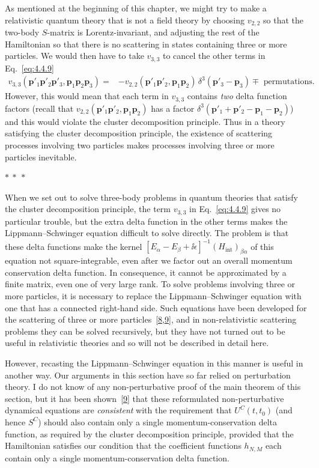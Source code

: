 As mentioned at the beginning of this chapter, we might try to make a
relativistic quantum theory that is not a field theory by choosing $v_{2,2}$ so
that the two-body $S$-matrix is Lorentz-invariant, and adjusting the rest of the
Hamiltonian so that there is no scattering in states containing three or more
particles. We would then have to take $v_{3,3}$ to cancel the other terms in
Eq.~\eqref{eq:4.4.9}
\begin{align}
v_{3,3}(\mathbf{p}'_1\mathbf{p}'_2\mathbf{p}'_3,
 \mathbf{p}_1\mathbf{p}_2\mathbf{p}_3)
={}&-v_{2,2}(\mathbf{p}'_1\mathbf{p}'_2,
 \mathbf{p}_1\mathbf{p}_2)\,
 \delta^3(\mathbf{p}'_3-\mathbf{p}_3)
 \mathbin{\mp}\text{ permutations}.
\tag{4.4.10}
\label{eq:4.4.10}
\end{align}
However, this would mean that each term in $v_{3,3}$ contains \emph{two} delta
function factors (recall that
$v_{2,2}(\mathbf{p}'_1\mathbf{p}'_2,\mathbf{p}_1\mathbf{p}_2)$ has a factor
$\delta^3(\mathbf{p}'_1+\mathbf{p}'_2-\mathbf{p}_1-\mathbf{p}_2)$) and this
would violate the cluster decomposition principle. Thus in a theory satisfying
the cluster decomposition principle, the existence of scattering processes
involving two particles makes processes involving three or more particles
inevitable.

\begin{center}
$*\ *\ *$
\end{center}

When we set out to solve three-body problems in quantum theories that satisfy
the cluster decomposition principle, the term $v_{3,3}$ in Eq.~\eqref{eq:4.4.9} gives no
particular trouble, but the extra delta function in the other terms makes the
Lippmann--Schwinger equation difficult to solve directly. The problem is that
these delta functions make the kernel
$[E_\alpha-E_\beta+\ii\epsilon]^{-1}(H_{\mathrm{int}})_{\beta\alpha}$ of this
equation not square-integrable, even after we factor out an overall momentum
conservation delta function. In consequence, it cannot be approximated by a
finite matrix, even one of very large rank. To solve problems involving three
or more particles, it is necessary to replace the Lippmann--Schwinger equation
with one that has a connected right-hand side. Such equations have been
developed for the scattering of three or more particles~\hyperref[ref:4.8]{[8,}\hyperref[ref:4.9]{9]}, and in
non-relativistic scattering problems they can be solved recursively, but they
have not turned out to be useful in relativistic theories and so will not be
described in detail here.

However, recasting the Lippmann--Schwinger equation in this manner is useful in
another way. Our arguments in this section have so far relied on perturbation
theory. I do not know of any non-perturbative proof of the main theorem of this
section, but it has been shown~\hyperref[ref:4.9]{[9]} that these reformulated non-perturbative
dynamical equations are \emph{consistent} with the requirement that
$U^C(t,t_0)$ (and hence $S^C$) should also contain only a single
momentum-conservation delta function, as required by the cluster decomposition
principle, provided that the Hamiltonian satisfies our condition that the
coefficient functions $h_{N,M}$ each contain only a single
momentum-conservation delta function.
